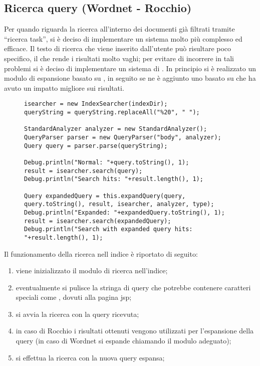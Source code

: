 \subsection{Ricerca query (Wordnet - Rocchio)}
Per quando riguarda la ricerca all'interno dei documenti già filtrati tramite ``ricerca task'', si è deciso di implementare un sistema molto più complesso ed efficace. Il testo di ricerca che viene inserito dall'utente può risultare poco specifico, il che rende i risultati molto vaghi; per evitare di incorrere in tali problemi si è deciso di implementare un sistema di . In principio si è realizzato un modulo di espansione basato su , in seguito se ne è aggiunto uno basato su  che ha avuto un impatto migliore sui risultati.
\begin{figure}[H]
\begin{lstlisting}[frame=trBL]
isearcher = new IndexSearcher(indexDir);
queryString = queryString.replaceAll("%20", " ");

StandardAnalyzer analyzer = new StandardAnalyzer();
QueryParser parser = new QueryParser("body", analyzer);
Query query = parser.parse(queryString);

Debug.println("Normal: "+query.toString(), 1);
result = isearcher.search(query);
Debug.println("Search hits: "+result.length(), 1);

Query expandedQuery = this.expandQuery(query, query.toString(), result, isearcher, analyzer, type);
Debug.println("Expanded: "+expandedQuery.toString(), 1);
result = isearcher.search(expandedQuery);
Debug.println("Search with expanded query hits: "+result.length(), 1);
\end{lstlisting}
\end{figure}
Il funzionamento della ricerca nell indice è riportato di seguito:
\begin{enumerate}
\item viene inizializzato il modulo di ricerca nell'indice;
\item eventualmente si pulisce la stringa di query che potrebbe contenere caratteri speciali come , dovuti alla pagina jsp;
\item si avvia la ricerca con la query ricevuta;
\item in caso di Rocchio i risultati ottenuti vengono utilizzati per l'espansione della query (in caso di Wordnet si espande chiamando il modulo adeguato);
\item si effettua la ricerca con la nuova query espansa;
\end{enumerate}
